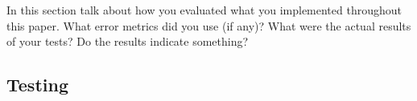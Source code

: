 In this section talk about how you evaluated what you implemented throughout this paper. What error metrics did you use (if any)?
What were the actual results of your tests? Do the results indicate something?

\subsection{Testing}

